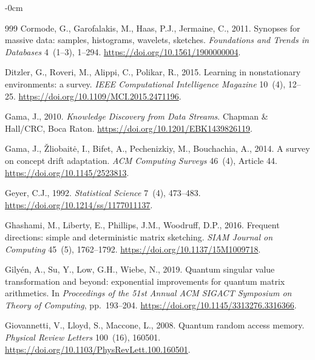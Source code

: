 \documentclass[sensors,article,submit,pdftex,moreauthors]{Definitions/mdpi}
\providecommand{\DIFadd}[1]{{\protect\color{blue}#1}} %
\providecommand{\DIFaddbegin}{} %
\providecommand{\DIFaddend}{} %
\begin{document}
\begin{adjustwidth}{-\extralength}{0cm}
\begin{thebibliography}{999}
Cormode, G., Garofalakis, M., Haas, P.J., Jermaine, C., 2011.
\newblock Synopses for massive data: samples, histograms, wavelets, sketches.
\newblock \emph{Foundations and Trends in Databases} 4~(1--3), 1--294.
\newblock \url{https://doi.org/10.1561/1900000004}.

Ditzler, G., Roveri, M., Alippi, C., Polikar, R., 2015.
\newblock Learning in nonstationary environments: a survey.
\newblock \emph{IEEE Computational Intelligence Magazine} 10~(4), 12--25.
\newblock \url{https://doi.org/10.1109/MCI.2015.2471196}.

Gama, J., 2010.
\newblock \emph{Knowledge Discovery from Data Streams}.
\newblock Chapman \& Hall/CRC, Boca Raton.
\newblock \url{https://doi.org/10.1201/EBK1439826119}.

Gama, J., \v{Z}liobait\.e, I., Bifet, A., Pechenizkiy, M., Bouchachia, A., 2014.
\newblock A survey on concept drift adaptation.
\newblock \emph{ACM Computing Surveys} 46~(4), Article 44.
\newblock \url{https://doi.org/10.1145/2523813}.

\DIFaddbegin {}
\DIFadd{Geyer, C.J., 1992.
}\newblock \DIFadd{Practical Markov chain Monte Carlo.
}\newblock \emph{\DIFadd{Statistical Science}} \DIFadd{7~(4), 473--483.
}\newblock \url{https://doi.org/10.1214/ss/1177011137}\DIFadd{.
}

\DIFaddend {}
Ghashami, M., Liberty, E., Phillips, J.M., Woodruff, D.P., 2016.
\newblock Frequent directions: simple and deterministic matrix sketching.
\newblock \emph{SIAM Journal on Computing} 45~(5), 1762--1792.
\newblock \url{https://doi.org/10.1137/15M1009718}.

Gily\'en, A., Su, Y., Low, G.H., Wiebe, N., 2019.
\newblock Quantum singular value transformation and beyond: exponential improvements for quantum matrix arithmetics.
\newblock In \emph{Proceedings of the 51st Annual ACM SIGACT Symposium on Theory of Computing}, pp.~193--204.
\newblock \url{https://doi.org/10.1145/3313276.3316366}.

Giovannetti, V., Lloyd, S., Maccone, L., 2008.
\newblock Quantum random access memory.
\newblock \emph{Physical Review Letters} 100~(16), 160501.
\newblock \url{https://doi.org/10.1103/PhysRevLett.100.160501}.


\end{thebibliography}
\end{adjustwidth}
\end{document}

